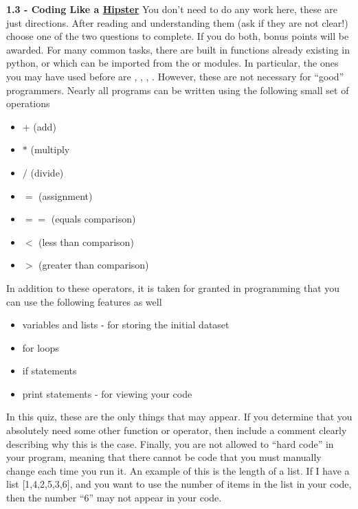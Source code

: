 \documentclass[12pt]{article}
\begin{document}
\newpage




\textbf{1.3 - Coding Like a \href{https://www.urbandictionary.com/define.php?term=hipster}{Hipster}} 
\newline
You don't need to do any work here, these are just directions.  After reading and understanding them (ask if they are not clear!) choose one of the two questions to complete.  If you do both, bonus points will be awarded.
\newline
\newline
For many common tasks, there are built in functions already existing in python, or which can be imported from the \small{} or \small{} modules.  In particular, the ones you may have used before are \small{}, \small{}, \small{}, \small{}.  However, these are not necessary for ``good'' programmers.  Nearly all programs can be written using the following small set of operations 
\begin{itemize}[noitemsep]
\item $+$ (add)
\item $*$ (multiply
\item $/$ (divide)
\item $=$ (assignment)
\item $==$ (equals comparison)
\item $<$ (less than comparison)
\item $>$ (greater than comparison)
\end{itemize}
In addition to these operators, it is taken for granted in programming that you can use the following features as well
\begin{itemize}[noitemsep]
\item variables and lists - for storing the initial dataset
\item for loops
\item if statements
\item print statements - for viewing your code
\end{itemize}
In this quiz, these are the only things that may appear.   If you determine that you absolutely need some other function or operator, then include a comment clearly describing why this is the case.
\newline
\newline
Finally, you are not allowed to ``hard code'' in your program, meaning that there cannot be code that you must manually change each time you run it.  An example of this is the length of a list.  If I have a list [1,4,2,5,3,6], and you want to use the number of items in the list in your code, then the number ``6'' may not appear in your code.  
\newline
\newpage
\end{document}
